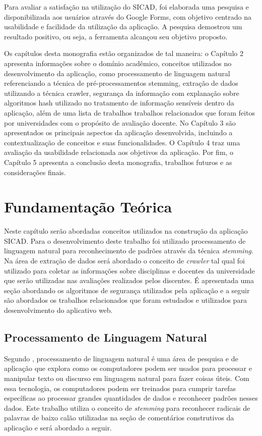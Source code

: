\documentclass[12pt, a4paper]{report}
\begin{document}
Para avaliar a satisfação na utilização do \ac{SICAD}, foi elaborada uma pesquisa e disponibilizada aos usuários através do Google Forms, com objetivo centrado na usabilidade e facilidade da utilização da aplicação. A pesquisa demostrou um resultado positivo, ou seja, a ferramenta alcançou seu objetivo proposto.

Os capítulos desta monografia estão organizados de tal maneira: o Capítulo 2 apresenta informações sobre o domínio acadêmico, conceitos utilizados no desenvolvimento da aplicação, como processamento de linguagem natural referenciando a técnica de pré-processamentos stemming, extração de dados utilizando a técnica crawler, segurança da informação com explanação sobre algoritmos hash utilizado no tratamento de informação sensíveis dentro da aplicação, além de uma lista de trabalhos trabalhos relacionados que foram feitos por universidades com o propósito de avaliação docente. No Capítulo 3 são apresentados os principais aspectos da aplicação desenvolvida, incluindo a contextualização de conceitos e suas funcionalidades. O Capítulo 4 traz uma avaliação da usabilidade relacionada aos objetivos da aplicação. Por fim, o Capítulo 5 apresenta a conclusão desta monografia, trabalhos futuros e as considerações finais.


\chapter{Fundamentação Teórica}
\label{chap:fundamentacaoteorica}

Neste capítulo serão abordadas conceitos utilizados na construção da aplicação \ac{SICAD}. Para o desenvolvimento deste trabalho foi utilizado processamento de linguagem natural para reconhecimento de padrões através da técnica \textit{stemming}. Na área de extração de dados será abordado o
conceito de \textit{crawler} tal qual foi utilizado para coletar as informações sobre disciplinas e docentes da universidade que serão utilizadas nas avaliações realizados pelos discentes. É apresentada uma seção abordando os algoritmos de segurança utilizados pela aplicação e a seguir são abordados os trabalhos relacionados que foram estudados e utilizados para desenvolvimento do aplicativo web.

\section{Processamento de Linguagem Natural}

Segundo \cite{chowdhury2003}, processamento de linguagem natural é uma área de pesquisa e de aplicação que explora como os computadores podem ser usados para processar e manipular texto ou discurso em linguagem natural para fazer coisas úteis. Com essa tecnologia, os computadores podem ser treinados para cumprir tarefas específicas ao processar grandes quantidades de dados e reconhecer padrões nesses dados.
Este trabalho utiliza o conceito de \textit{stemming} para reconhecer radicais de palavras de baixo calão utilizadas na seção de comentários construtivos da aplicação e será abordado a seguir.
\end{document}
